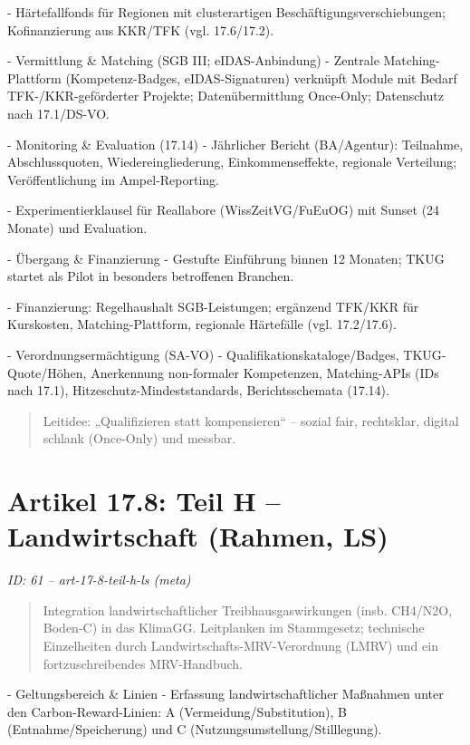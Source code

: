 \documentclass[12pt,a4paper]{scrartcl}
\begin{document}
- Härtefallfonds für Regionen mit clusterartigen Beschäftigungsverschiebungen; Kofinanzierung aus KKR/TFK (vgl. 17.6/17.2).

- Vermittlung \& Matching (SGB III; eIDAS-Anbindung)
- Zentrale Matching-Plattform (Kompetenz-Badges, eIDAS-Signaturen) verknüpft Module mit Bedarf TFK-/KKR-geförderter Projekte; Datenübermittlung Once-Only; Datenschutz nach 17.1/DS-VO.

- Monitoring \& Evaluation (17.14)
- Jährlicher Bericht (BA/Agentur): Teilnahme, Abschlussquoten, Wiedereingliederung, Einkommenseffekte, regionale Verteilung; Veröffentlichung im Ampel-Reporting.

- Experimentierklausel für Reallabore (WissZeitVG/FuEuOG) mit Sunset (24 Monate) und Evaluation.

- Übergang \& Finanzierung
- Gestufte Einführung binnen 12 Monaten; TKUG startet als Pilot in besonders betroffenen Branchen.

- Finanzierung: Regelhaushalt SGB-Leistungen; ergänzend TFK/KKR für Kurskosten, Matching-Plattform, regionale Härtefälle (vgl. 17.2/17.6).

- Verordnungsermächtigung (SA-VO)
- Qualifikationskataloge/Badges, TKUG-Quote/Höhen, Anerkennung non-formaler Kompetenzen, Matching-APIs (IDs nach 17.1), Hitzeschutz-Mindeststandards, Berichtsschemata (17.14).

{\footnotesize\begin{quote}
Leitidee: „Qualifizieren statt kompensieren“ -- sozial fair, rechtsklar, digital schlank (Once-Only) und messbar.
\end{quote}}



\section[Artikel 17.8: Teil H -- Landwirtschaft (Rahmen, LS)]{Artikel 17.8: Teil H -- Landwirtschaft (Rahmen, LS)}
\noindent\textit{ID: 61 -- art-17-8-teil-h-ls (meta)}

\begin{quote}
Integration landwirtschaftlicher Treibhausgaswirkungen (insb. CH4/N2O, Boden-C) in das KlimaGG. Leitplanken im Stammgesetz; technische Einzelheiten durch Landwirtschafts-MRV-Verordnung (LMRV) und ein fortzuschreibendes MRV-Handbuch.
\end{quote}

- Geltungsbereich \& Linien
- Erfassung landwirtschaftlicher Maßnahmen unter den Carbon-Reward-Linien: A (Vermeidung/Substitution), B (Entnahme/Speicherung) und C (Nutzungsumstellung/Stilllegung).
\end{document}
